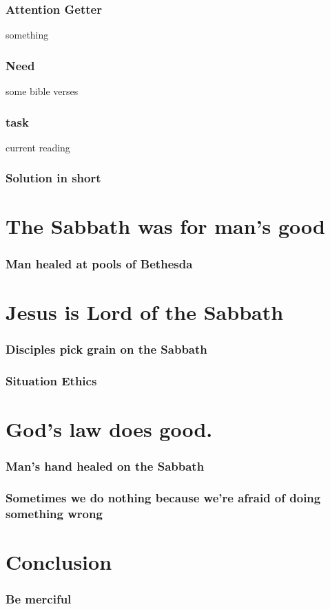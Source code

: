 \documentclass{beamer}
\begin{document}
\begin{frame}
\frametitle{Attention Getter}
something
\end{frame}

\begin{frame}
\frametitle{Need}
some bible verses
\end{frame}

\begin{frame}
\frametitle{task}
current reading
\end{frame}

\begin{frame}
\frametitle{Solution in short}
\end{frame}

\begin{frame}
\frametitle{\insertlecture}
\tableofcontents[sectionstyle=show/show]
\end{frame}

\section{The Sabbath was for man's good}
\begin{frame}
\frametitle{Man healed at pools of Bethesda}
\end{frame}

\begin{frame}
\frametitle{}
\end{frame}

\section{Jesus is Lord of the Sabbath}

\begin{frame}
\frametitle{Disciples pick grain on the Sabbath}
\end{frame}

\begin{frame}
\frametitle{Situation Ethics}
\end{frame}

\section{God's law does good.}

\begin{frame}
\frametitle{Man's hand healed on the Sabbath}
\end{frame}

\begin{frame}
\frametitle{Sometimes we do nothing because we're afraid of doing something wrong}
\end{frame}

\section*{Conclusion}
\begin{frame}
\frametitle{Be merciful}
\end{frame}
\end{document}

